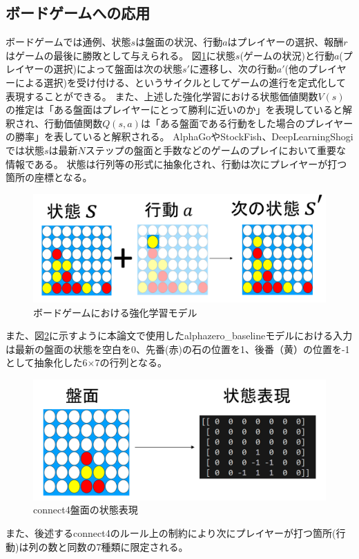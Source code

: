 \subsection{ボードゲームへの応用}
ボードゲームでは通例、状態$s$は盤面の状況、行動$a$はプレイヤーの選択、報酬$r$はゲームの最後に勝敗として与えられる。
図\ref{fig:board-game-model}に状態$s$(ゲームの状況)と行動$a$(プレイヤーの選択)によって盤面は次の状態$s'$に遷移し、次の行動$a'$(他のプレイヤーによる選択)を受け付ける、というサイクルとしてゲームの進行を定式化して表現することができる。
また、上述した強化学習における状態価値関数$V(s)$の推定は「ある盤面はプレイヤーにとって勝利に近いのか」を表現していると解釈され、行動価値関数$Q(s, a)$は「ある盤面である行動をした場合のプレイヤーの勝率」を表していると解釈される。
AlphaGo\cite{AlphaGo}やStockFish\cite{StockFish12}、DeepLearningShogi\cite{dlshogi}では状態$s$は最新$N$ステップの盤面と手数などのゲームのプレイにおいて重要な情報である。
状態は行列等の形式に抽象化され、行動は次にプレイヤーが打つ箇所の座標となる。
\begin{figure}[t]
	\includegraphics[width=\linewidth]{./figure/transition.png}
	\caption{ボードゲームにおける強化学習モデル}
	\label{fig:board-game-model}
\end{figure}

また、図\ref{fig:connect4-symbol}に示すように本論文で使用したalphazero\_baselineモデル\cite{baseline}における入力は最新の盤面の状態を空白を0、先番(赤)の石の位置を1、後番（黄）の位置を-1として抽象化した6$\times$7の行列となる。
\begin{figure}[t]
	\centering
	\includegraphics[width=\linewidth]{./figure/symbolic.png}
	\caption{connect4盤面の状態表現}
	\label{fig:connect4-symbol}
\end{figure}
また、後述するconnect4のルール上の制約により次にプレイヤーが打つ箇所(行動)は列の数と同数の7種類に限定される。


